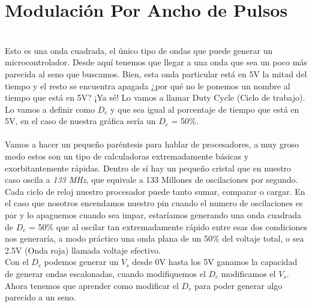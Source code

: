 \documentclass[]{article}
\begin{document}
\section*{Modulación Por Ancho de Pulsos}
\\
Esto es una onda cuadrada, el único tipo de ondas que puede generar un microcontrolador. Desde aquí tenemos que llegar a una onda que sea un poco más parecida al seno que buscamos. Bien, esta onda particular está en 5V la mitad del tiempo y el resto se encuentra apagada ¿por qué no le ponemos un nombre al tiempo que está en 5V? ¡Ya sé! Lo vamos a llamar Duty Cycle (Ciclo de trabajo). Lo vamos a definir como $D_{c}$ y que sea igual al porcentaje de tiempo que está en 5V, en el caso de nuestra gráfica sería un $D_{c}$ = 50\%.\\\\
Vamos a hacer un pequeño paréntesis para hablar de procesadores, a muy groso modo estos son un tipo de calculadoras extremadamente básicas y exorbitantemente rápidas. Dentro de sí hay un pequeño cristal que en nuestro caso oscila a \textit{133 MHz}, que equivale a 133 Millones de oscilaciones por segundo. Cada ciclo de reloj nuestro procesador puede tanto sumar, comparar o cargar. En el caso que nosotros encendamos nuestro pin cuando el numero de oscilaciones es par y lo apaguemos cuando sea impar, estaríamos generando una onda cuadrada de $D_c$ = 50\% que al oscilar tan extremadamente rápido entre esas dos condiciones nos generaría, a modo práctico una onda plana de un 50\% del voltaje total, o sea 2.5V (Onda roja) llamada voltaje efectivo.\\
Con el $D_c$ podemos generar un $V_s$ desde 0V hasta los 5V ganamos la capacidad de generar ondas escalonadas, cuando modifiquemos el $D_c$ modificamos el $V_s$. Ahora tenemos que aprender como modificar el $D_c$ para poder generar algo parecido a un seno.
\end{document}
